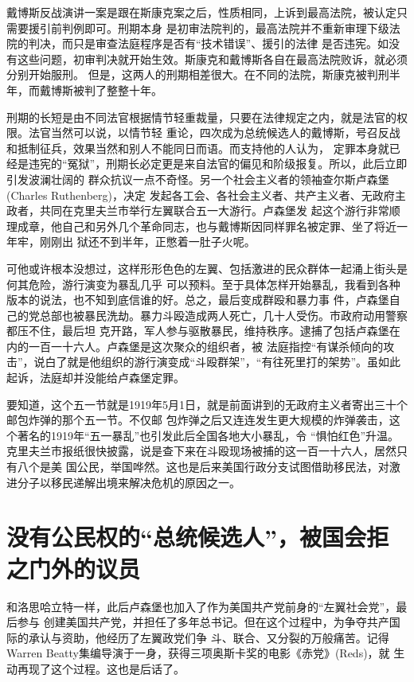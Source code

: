 \documentclass[10pt]{article}
\begin{document}
{戴博斯反战演讲一案是跟在斯康克案之后，性质相同，上诉到最高法院，被认定只需要援引前判例即可。刑期本身
是初审法院判的，最高法院并不重新审理下级法院的判决，而只是审查法庭程序是否有``技术错误''、援引的法律
是否违宪。如没有这些问题，初审判决就开始生效。斯康克和戴博斯各自在最高法院败诉，就必须分别开始服刑。
但是，这两人的刑期相差很大。在不同的法院，斯康克被判刑半年，而戴博斯被判了整整十年。

刑期的长短是由不同法官根据情节轻重裁量，只要在法律规定之内，就是法官的权限。法官当然可以说，以情节轻
重论，四次成为总统候选人的戴博斯，号召反战和抵制征兵，效果当然和别人不能同日而语。而支持他的人认为，
定罪本身就已经是违宪的``冤狱''，刑期长必定更是来自法官的偏见和阶级报复。所以，此后立即引发波澜壮阔的
群众抗议一点不奇怪。另一个社会主义者的领袖查尔斯\textperiodcentered 卢森堡(Charles Ruthenberg)，决定
发起各工会、各社会主义者、共产主义者、无政府主政者，共同在克里夫兰市举行左翼联合五一大游行。卢森堡发
起这个游行非常顺理成章，他自己和另外几个革命同志，也与戴博斯因同样罪名被定罪、坐了将近一年牢，刚刚出
狱还不到半年，正憋着一肚子火呢。

可他或许根本没想过，这样形形色色的左翼、包括激进的民众群体一起涌上街头是何其危险，游行演变为暴乱几乎
可以预料。至于具体怎样开始暴乱，我看到各种版本的说法，也不知到底信谁的好。总之，最后变成群殴和暴力事
件，卢森堡自己的党总部也被暴民洗劫。暴力斗殴造成两人死亡，几十人受伤。市政府动用警察都压不住，最后坦
克开路，军人参与驱散暴民，维持秩序。逮捕了包括卢森堡在内的一百一十六人。卢森堡是这次聚众的组织者，被
法庭指控``有谋杀倾向的攻击''，说白了就是他组织的游行演变成``斗殴群架''，``有往死里打的架势''。虽如此
起诉，法庭却并没能给卢森堡定罪。

要知道，这个五一节就是1919年5月1日，就是前面讲到的无政府主义者寄出三十个邮包炸弹的那个五一节。不仅邮
包炸弹之后又连连发生更大规模的炸弹袭击，这个著名的1919年``五一暴乱''也引发此后全国各地大小暴乱，令
``惧怕红色''升温。克里夫兰市报纸很快披露，说是查下来在斗殴现场被捕的这一百一十六人，居然只有八个是美
国公民，举国哗然。这也是后来美国行政分支试图借助移民法，对激进分子以移民递解出境来解决危机的原因之一。

\pagebreak
\section{没有公民权的``总统候选人''，被国会拒之门外的议员}

和洛思\textperiodcentered 哈立特一样，此后卢森堡也加入了作为美国共产党前身的``左翼社会党''，最后参与
创建美国共产党，并担任了多年总书记。但在这个过程中，为争夺共产国际的承认与资助，他经历了左翼政党们争
斗、联合、又分裂的万般痛苦。记得Warren Beatty集编导演于一身，获得三项奥斯卡奖的电影《赤党》(Reds)，就
生动再现了这个过程。这也是后话了。

}
\end{document}
